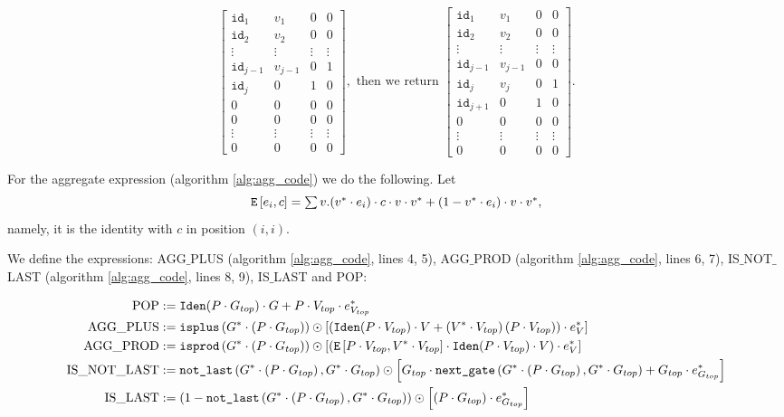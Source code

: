 \[
\begin{bmatrix}
    \texttt{id}_1 & v_1 & 0 & 0 \\
    \texttt{id}_2 & v_2 & 0 & 0 \\
    \vdots & \vdots & \vdots & \vdots \\
    \texttt{id}_{j-1} & v_{j-1} & 0 & 1 \\
    \texttt{id}_j & 0 & 1 & 0 \\
    0 & 0 & 0 & 0 \\
    0 & 0 & 0 & 0 \\
    \vdots & \vdots & \vdots & \vdots \\
     0 & 0 & 0 & 0
\end{bmatrix}, \text{ then we return }
\begin{bmatrix}
    \texttt{id}_1 & v_1 & 0 & 0 \\
    \texttt{id}_2 & v_2 & 0 & 0 \\
    \vdots & \vdots & \vdots & \vdots \\
    \texttt{id}_{j-1} & v_{j-1} & 0 & 0 \\
    \texttt{id}_j & v_j & 0 & 1 \\
    \texttt{id}_{j+1} & 0 & 1 & 0 \\
    0 & 0 & 0 & 0 \\
    \vdots & \vdots & \vdots & \vdots \\
     0 & 0 & 0 & 0
\end{bmatrix}.
\]


For the aggregate expression (algorithm \ref{alg:agg_code}) we do the following. Let $$\texttt{E}\left[ e_i, c \right]=\textstyle\sum v. (v^*\cdot e_i)\cdot c\cdot v\cdot v^* + (1-v^*\cdot e_i)\cdot v \cdot v^*,$$ namely, it is the identity with $c$ in position $(i,i)$.

We define the expressions: AGG${\_}$PLUS (algorithm \ref{alg:agg_code}, lines 4, 5), AGG${\_}$PROD (algorithm \ref{alg:agg_code}, lines 6, 7),  IS${\_}$NOT${\_}$LAST (algorithm \ref{alg:agg_code}, lines 8, 9), IS${\_}$LAST and POP:

\begin{align*}
	\text{POP} &:= \texttt{Iden}(P\cdot G_{top})\cdot G + P\cdot V_{top}\cdot e_{V_{top}}^*  \\
	\text{AGG{\_}PLUS} &:= \texttt{isplus}\left( G^* \cdot \left( P \cdot G_{top}\right) \right) \odot \left[ \left( \texttt{Iden}(P\cdot V_{top}) \cdot V + \left( V^* \cdot V_{top} \right)\left( P\cdot V_{top} \right)\right) \cdot e_{V}^* \right] \\
	\text{AGG{\_}PROD} &:= \texttt{isprod}\left(G^* \cdot \left( P \cdot G_{top}\right) \right) \odot \left[ \left( \texttt{E}\left[ P\cdot V_{top}, V^* \cdot V_{top} \right] \cdot \texttt{Iden}(P\cdot V_{top}) \cdot V \right) \cdot e_{V}^* \right] \\
	\text{IS{\_}NOT{\_}LAST} &:= \texttt{not{\_}last}\left(G^* \cdot \left( P \cdot G_{top}\right),G^* \cdot G_{top} \right) \odot \left[  G_{top} \cdot \texttt{next{\_}gate}\left(G^* \cdot \left( P\cdot G_{top} \right) , G^* \cdot G_{top} \right) + G_{top}\cdot e_{G_{top}}^* \right] \\
	\text{IS{\_}LAST} &:= \left( 1 - \texttt{not{\_}last}\left(G^* \cdot \left( P \cdot G_{top}\right),G^* \cdot G_{top} \right) \right)\odot \left[ \left( P\cdot G_{top} \right) \cdot e_{G_{top}}^* \right]
\end{align*}

